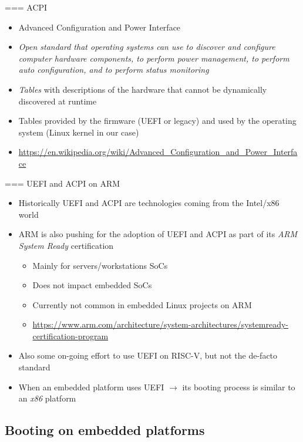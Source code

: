 === {ACPI}
  \begin{itemize}
  \item Advanced Configuration and Power Interface
  \item {\em Open standard that operating systems can use to discover
      and configure computer hardware components, to perform power
      management, to perform auto configuration, and to perform status
      monitoring}
  \item {\em Tables} with descriptions of the hardware that cannot be
    dynamically discovered at runtime
  \item Tables provided by the firmware (UEFI or legacy) and used by
    the operating system (Linux kernel in our case)
  \item \small \url{https://en.wikipedia.org/wiki/Advanced_Configuration_and_Power_Interface}
  \end{itemize}


=== {UEFI and ACPI on ARM}
  \begin{itemize}
  \item Historically UEFI and ACPI are technologies coming from the
    Intel/x86 world
  \item ARM is also pushing for the adoption of UEFI and ACPI as part
    of its {\em ARM System Ready} certification
    \begin{itemize}
    \item Mainly for servers/workstations SoCs
    \item Does not impact embedded SoCs
    \item Currently not common in embedded Linux projects on ARM
    \item \url{https://www.arm.com/architecture/system-architectures/systemready-certification-program}
    \end{itemize}
  \item Also some on-going effort to use UEFI on RISC-V, but not the
    de-facto standard
  \item When an embedded platform uses UEFI $\rightarrow$ its booting
    process is similar to an {\em x86} platform
  \end{itemize}


\subsection{Booting on embedded platforms}

